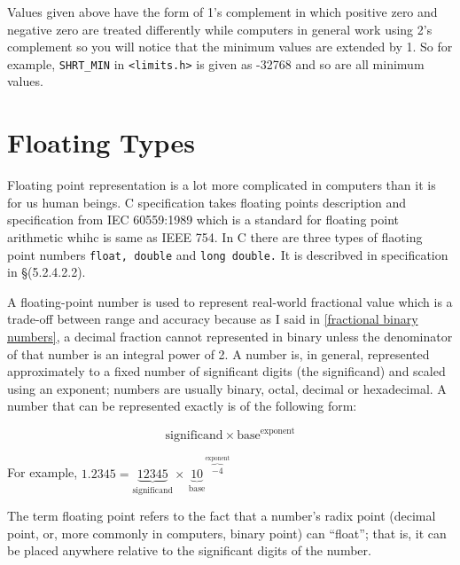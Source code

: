 Values given above have the form of 1's complement in which positive zero and
negative zero are treated differently while computers in general work using 2's
complement so you will notice that the minimum values are extended by 1. So for
example, \texttt{SHRT\_MIN} in \texttt{<limits.h>} is given as -32768 and so
are all minimum values.

\section{Floating Types}
Floating point representation is a lot more complicated in computers than it
is for us human beings. C specification takes floating points description and
specification from IEC 60559:1989 which is a standard for floating point
arithmetic whihc is same as IEEE 754. In C there are three types of flaoting
point numbers \texttt{float, double} and \texttt{long double.} It is describved
in specification in \S(5.2.4.2.2).

A floating-point number is used to represent real-world fractional value which
is a trade-off between range and accuracy because as I said in \ref{fractional
  binary numbers}, a decimal fraction cannot represented in binary unless the
denominator of that number is an integral power of 2. A number is, in general,
represented approximately to a fixed number of significant digits (the
significand) and scaled using an exponent; numbers are usually binary, octal,
decimal or hexadecimal. A number that can be represented exactly is of the
following form:

$$\text{significand} \times \text{base}^\text{exponent}$$

For example, $1.2345 = \underbrace{12345}_\text{significand} \times
\,\underbrace{10}_\text{base}\!\!\!\!\!\!^{\overbrace{-4}^\text{exponent}}$

The term floating point refers to the fact that a number's radix point (decimal
point, or, more commonly in computers, binary point) can ``float''; that is, it
can be placed anywhere relative to the significant digits of the number.

